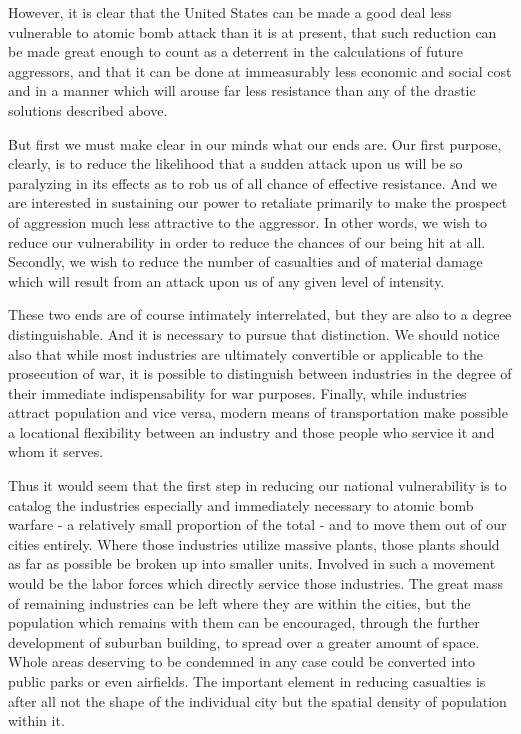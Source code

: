 However, it is clear that the United States can be made a good deal less vulnerable to atomic bomb attack than it is at present, that such reduction can be made great enough to count as a deterrent in the calculations of future aggressors, and that it can be done at immeasurably less economic and social cost and in a manner which will arouse far less resistance than any of the drastic solutions described above.

But first we must make clear in our minds what our ends are. Our first purpose, clearly, is to reduce the likelihood that a sudden attack upon us will be so paralyzing in its effects as to rob us of all chance of effective resistance. And we are interested in sustaining our power to retaliate primarily to make the prospect of aggression much less attractive to the aggressor. In other words, we wish to reduce our vulnerability in order to reduce the chances of our being hit at all. Secondly, we wish to reduce the number of casualties and of material damage which will result from an attack upon us of any given level of intensity.

These two ends are of course intimately interrelated, but they are also to a degree distinguishable. And it is necessary to pursue that distinction. We should notice also that while most industries are ultimately convertible or applicable to the prosecution of war, it is possible to distinguish between industries in the degree of their immediate indispensability for war purposes. Finally, while industries attract population and vice versa, modern means of transportation make possible a locational flexibility between an industry and those people who service it and whom it serves.

Thus it would seem that the first step in reducing our national vulnerability is to catalog the industries especially and immediately necessary to atomic bomb warfare - a relatively small proportion of the total - and to move them out of our cities entirely. Where those industries utilize massive plants, those plants should as far as possible be broken up into smaller units. Involved in such a movement would be the labor forces which directly service those industries. The great mass of remaining industries can be left where they are within the cities, but the population which remains with them can be encouraged, through the further development of suburban building, to spread over a greater amount of space. Whole areas deserving to be condemned in any case could be converted into public parks or even airfields. The important element in reducing casualties is after all not the shape of the individual city but the spatial density of population within it.

